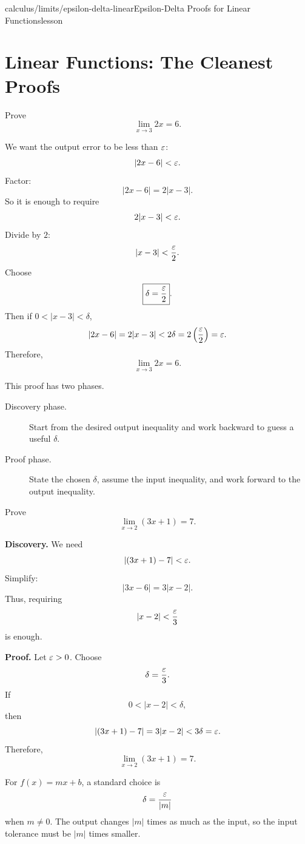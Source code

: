 \begin{webpage}{calculus/limits/epsilon-delta-linear}{Epsilon-Delta Proofs for Linear Functions}{lesson}
\section{Linear Functions: The Cleanest Proofs}


\begin{bgguided}[title={\(f(x)=2x\)}]
Prove
\[
  \lim_{x\to3}2x=6.
\]

\begin{bgsolution}
We want the output error to be less than \(\varepsilon\):
\[
  |2x-6|<\varepsilon.
\]
Factor:
\[
  |2x-6|=2|x-3|.
\]
So it is enough to require
\[
  2|x-3|<\varepsilon.
\]
Divide by \(2\):
\[
  |x-3|<\frac{\varepsilon}2.
\]
Choose
\[
  \boxed{\delta=\frac{\varepsilon}2}.
\]
Then if \(0<|x-3|<\delta\),
\[
  |2x-6|=2|x-3|<2\delta=2\left(\frac{\varepsilon}2\right)=\varepsilon.
\]
Therefore,
\[
  \lim_{x\to3}2x=6.
\]
\end{bgsolution}
\end{bgguided}



This proof has two phases.

\begin{description}
  \item[Discovery phase.] Start from the desired output inequality and work backward to guess a useful \(\delta\).
  \item[Proof phase.] State the chosen \(\delta\), assume the input inequality, and work forward to the output inequality.
\end{description}

\begin{bgexample}[title={A general linear function}]
Prove
\[
  \lim_{x\to2}(3x+1)=7.
\]

\begin{bgsolution}
\textbf{Discovery.} We need
\[
  |(3x+1)-7|<\varepsilon.
\]
Simplify:
\[
  |3x-6|=3|x-2|.
\]
Thus, requiring
\[
  |x-2|<\frac{\varepsilon}3
\]
is enough.

\textbf{Proof.} Let \(\varepsilon>0\). Choose
\[
  \delta=\frac{\varepsilon}3.
\]
If
\[
  0<|x-2|<\delta,
\]
then
\[
  |(3x+1)-7|=3|x-2|<3\delta=\varepsilon.
\]
Therefore,
\[
  \boxed{\lim_{x\to2}(3x+1)=7}.
\]
\end{bgsolution}
\end{bgexample}

\begin{bgsummary}
For \(f(x)=mx+b\), a standard choice is
\[
  \delta=\frac{\varepsilon}{|m|}
\]
when \(m\ne0\). The output changes \(|m|\) times as much as the input, so the input tolerance must be \(|m|\) times smaller.
\end{bgsummary}
\end{webpage}

